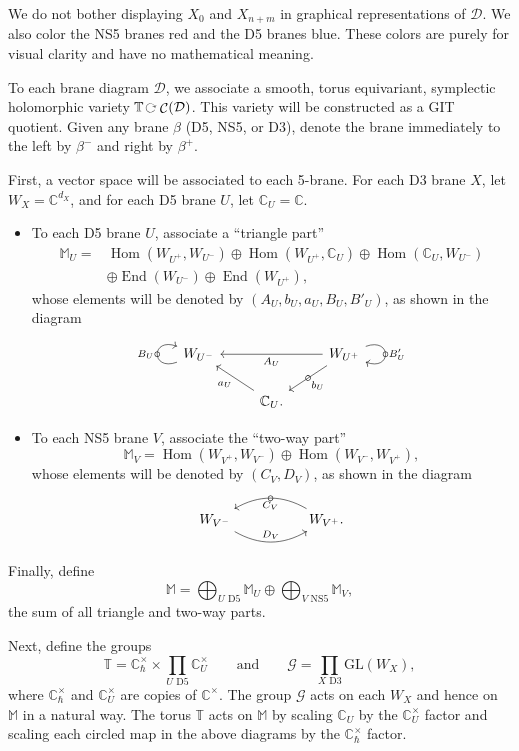 \documentclass[11pt]{article}
\numberwithin{equation}{section}
\newcommand{\brane}{\mathcal D}
\newcommand{\CC}{\mathbb C}
\newcommand{\torus}{\mathbb T}
\newcommand{\MM}{\mathbb M}
\newcommand{\G}{\mathcal G}
\DeclareMathOperator{\bowvar}{\mathcal C}
\DeclareMathOperator{\Hom}{Hom}
\DeclareMathOperator{\End}{End}
\begin{document}
We do not bother displaying $X_0$ and $X_{n + m}$ in graphical representations of $\brane$. We also color the NS5 branes red and the D5 branes blue. These colors are purely for visual clarity and have no mathematical meaning.

To each brane diagram $\brane$, we associate a smooth, torus equivariant, symplectic holomorphic variety $\torus\, \rotatebox[origin=c]{-90}{$\circlearrowright$}\,\bowvar(\brane)$. This variety will be constructed as a GIT quotient. Given any brane $\beta$ (D5, NS5, or D3), denote the brane immediately to the left by $\beta^-$ and right by $\beta^+$.


First, a vector space will be associated to each 5-brane. For each D3 brane $X$, let $W_X = \CC^{d_X}$, and for each D5 brane $U$, let $\CC_U = \CC$.
\begin{itemize}\itemsep=0pt
\item To each D5 brane $U$, associate a ``triangle part''
\begin{align*}
\MM_U={}&\Hom(W_{U^+},W_{U^-}) \oplus
\Hom(W_{U^+},\CC_U) \oplus \Hom(\CC_U,W_{U^-}) \\
& \oplus\End(W_{U^-}) \oplus \End(W_{U^+}),
\end{align*}
whose elements will be denoted by $(A_U, b_U, a_U, B_U, B'_U)$, as shown in the diagram
\[
\begin{tikzcd}
W_{U^-} \arrow[loop,out=200,in=160,distance=2em, "B_U", "\circ" marking] & & W_{U^+} \arrow[ld, "\circ" marking, "b_U" ] \arrow[ll, "A_U"] \arrow[loop,out=20,in=-20,distance=2em, "B'_U", "\circ" marking] \\
& \CC_U.\arrow[ul, "a_U"] &
\end{tikzcd}
\]

\item To each NS5 brane $V$, associate the ``two-way part''
\[
\MM_V= \Hom(W_{V^+},W_{V^-}) \oplus
\Hom(W_{V^-},W_{V^+}),
\]
whose elements will be denoted by $(C_V, D_V)$, as shown in the diagram
\[
\begin{tikzcd}
W_{V^-} \ar[rr,bend right, "D_V"] & & W_{V^+}. \ar[ll, "C_V", bend right, "\circ" marking]
\end{tikzcd}
\]
\end{itemize}
Finally, define
\[
\MM=\bigoplus_{U\text{ D5}}\MM_U \oplus \bigoplus_{V\text{ NS5}}\MM_V,
\]
the sum of all triangle and two-way parts.

Next, define the groups
\[
\torus = \CC_\hbar^\times \times \prod_{U \text{ D5}}\CC_U^\times \qquad\text{and}\qquad \G = \prod_{X \text{ D3}} \mathrm{GL}(W_X),
\]
where $\CC_\hbar^\times$ and $\CC^\times_U$ are copies of $\CC^\times$. The group $\G$ acts on each $W_X$ and hence on $\MM$ in a natural way. The torus $\torus$ acts on $\MM$ by scaling $\CC_U$ by the $\CC_U^\times$ factor and scaling each circled map in the above diagrams by the $\CC^\times_\hbar$ factor.
\end{document}
